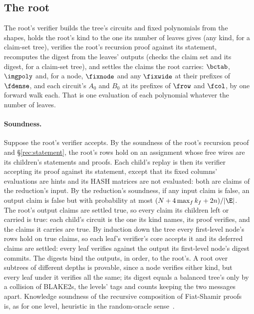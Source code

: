 \subsection{The root}\label{rec:root}

The root's verifier builds the tree's circuits and fixed polynomials from the shapes, holds the root's kind to the one its number of leaves gives (any kind, for a claim-set tree), verifies the root's recursion proof against its statement, recomputes the digest from the leaves' outputs (checks the claim set and its digest, for a claim-set tree), and settles the claims the root carries: $\bctab$, $\imgpoly$ and, for a node, $\fixnode$ and any $\fixwide$ at their prefixes of $\fdense$, and each circuit's $A_0$ and $B_0$ at its prefixes of $\frow$ and $\fcol$, by one forward walk each. That is one evaluation of each polynomial whatever the number of leaves.

\paragraph{Soundness.} Suppose the root's verifier accepts. By the soundness of the root's recursion proof and \S\ref{rec:statement}, the root's rows hold on an assignment whose free wires are its children's statements and proofs. Each child's replay is then its verifier accepting its proof against its statement, except that its fixed columns' evaluations are hints and its \textsf{HASH} matrices are not evaluated: both are claims of the reduction's input. By the reduction's soundness, if any input claim is false, an output claim is false but with probability at most $(N+4\max_fk_f+2n)/|\E|$. The root's output claims are settled true, so every claim its children left or carried is true: each child's circuit is the one its kind names, its proof verifies, and the claims it carries are true. By induction down the tree every first-level node's rows hold on true claims, so each leaf's verifier's core accepts it and its deferred claims are settled: every leaf verifies against the output its first-level node's digest commits. The digests bind the outputs, in order, to the root's. A root over subtrees of different depths is provable, since a node verifies either kind, but every leaf under it verifies all the same; its digest equals a balanced tree's only by a collision of BLAKE2s, the levels' tags and counts keeping the two messages apart. Knowledge soundness of the recursive composition of Fiat-Shamir proofs is, as for one level, heuristic in the random-oracle sense~\cite{BCCT13}.

